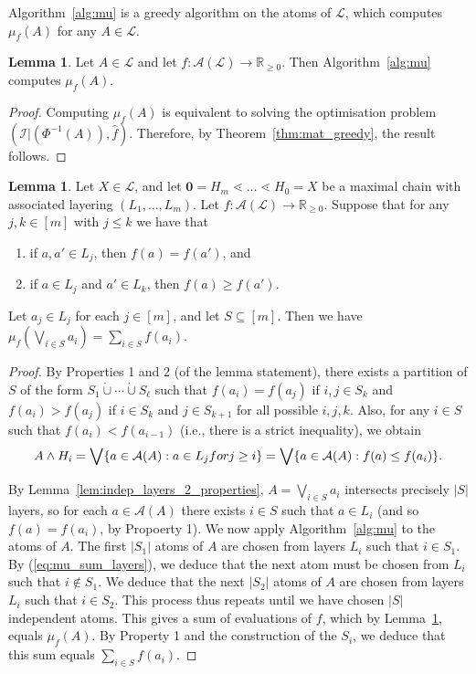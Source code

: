 \documentclass[a4paper,11pt,reqno]{article}
\theoremstyle{definition}
\newtheorem{lemma}[theorem]{{{Lemma}}}
\newcommand{\mL}{\mathcal{L}}
\newcommand{\mA}{\mathcal{A}}
\newcommand{\RR}{\mathbb{R}}
\newcommand{\zero}{{\mathbf{0}}}
\begin{document}
Algorithm~\ref{alg:mu} is a greedy algorithm on the atoms of $\mathcal{L}$, which computes $\mu_f(A)$ for any $A\in\mathcal{L}$.

\begin{lemma}\label{lem:greedy_alg}
    Let $A\in\mathcal{L}$ and let $f:\mA(\mL)\to \RR_{\geq 0}$. Then Algorithm~\ref{alg:mu} computes $\mu_f(A)$. 
\end{lemma}
\begin{proof}
    Computing $\mu_f(A)$ is equivalent to solving the optimisation problem $(\mathcal{I}|(\Phi^{-1}(A)),\hat{f})$. Therefore, by Theorem~\ref{thm:mat_greedy}, the result follows.
\end{proof}

\begin{lemma}\label{lem:mu_of_join_of_layers}
    Let $X\in\mathcal{L}$, and let $\zero=H_m\lessdot\dots\lessdot H_0=X$ be a maximal chain with associated layering $(L_1,\dots,L_m)$. 
    Let $f:\mA(\mL)\to \RR_{\geq 0}$.
    Suppose that for any $j,k\in[m]$ with $j\leq k$ we have that
    \begin{enumerate}
        \item if $a,a'\in L_j$, then $f(a)=f(a')$, and
        \item if $a\in L_j$ and $a'\in L_k$, then $f(a)\geq f(a')$.
    \end{enumerate}
    Let $a_j\in L_j$ for each $j\in[m]$, and let $S\subseteq[m]$. Then we have 
        $\displaystyle \mu_f\left(\bigvee_{i\in S}a_i\right)=\sum_{i\in S}f(a_i).$
\end{lemma}
\begin{proof}
    By Properties 1 and 2 (of the lemma statement), there exists a partition of $S$ of the form $S_1\dot\cup\cdots\dot\cup S_\ell$ such that $f(a_i)=f(a_j)$ if $i,j\in S_k$ and $f(a_i)>f(a_j)$ if $i\in S_k$ and $j\in S_{k+1}$ for all possible $i,j,k$. Also, for any $i\in S$ such that $f(a_i)<f(a_{i-1})$ (i.e., there is a strict inequality), we obtain
    \begin{equation}\label{eq:mu_sum_layers}
        A\wedge H_i=\bigvee\{a\in\mathcal{A}(A):a\in L_j\textup{ for }j\geq i\}=\bigvee\{a\in\mathcal{A}(A):f(a)\leq f(a_i)\}.
    \end{equation}

    By Lemma~\ref{lem:indep_layers_2_properties}, $A=\bigvee_{i\in S}a_i$ intersects precisely $|S|$ layers, so for each $a\in\mathcal{A}(A)$ there exists $i\in S$ such that $a\in L_i$ (and so $f(a)=f(a_i)$, by Propoerty 1). We now apply Algorithm~\ref{alg:mu} to the atoms of $A$. The first $|S_1|$ atoms of $A$ are chosen from layers $L_i$ such that $i\in S_1$. By (\ref{eq:mu_sum_layers}), we deduce that the next atom must be chosen from $L_i$ such that $i\notin S_1$. We deduce that the next $|S_2|$ atoms of $A$ are chosen from layers $L_i$ such that $i\in S_2$. This process thus repeats until we have chosen $|S|$ independent atoms. This gives a sum of evaluations of $f$, which by Lemma~\ref{lem:greedy_alg}, equals $\mu_f(A)$. By Property 1 and the construction of the $S_i$, we deduce that this sum equals $\sum_{i\in S}f(a_i)$.
\end{proof}
\end{document}
